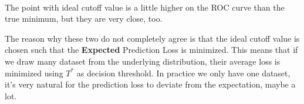 \documentclass[11pt]{article}
\begin{document}
    \begin{center}
    \end{center}
    { \hspace*{\fill} \\}
    
    The point with ideal cutoff value is a little higher on the ROC curve
than the true minimum, but they are very close, too.

The reason why these two do not completely agree is that the ideal
cutoff value is chosen such that the \textbf{Expected} Prediction Loss
is minimized. This means that if we draw many dataset from the
underlying distribution, their average loss is minimized using \(T^*\)
as decision threshold. In practice we only have one dataset, it's very
natural for the prediction loss to deviate from the expectation, maybe a
lot.
\end{document}
